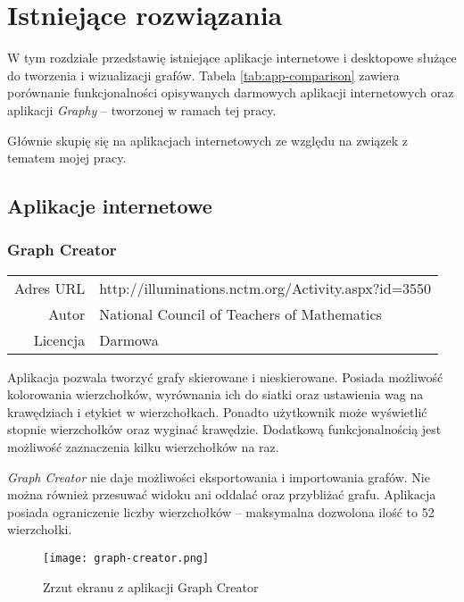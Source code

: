 \chapter{Istniejące rozwiązania}

W tym rozdziale przedstawię istniejące aplikacje internetowe \cite{mathex} i desktopowe służące do tworzenia i wizualizacji grafów. Tabela \ref{tab:app-comparison} zawiera porównanie funkcjonalności opisywanych darmowych aplikacji internetowych oraz aplikacji \emph{Graphy} -- tworzonej w ramach tej pracy. 

Głównie skupię się na aplikacjach internetowych ze względu na związek z tematem mojej pracy. 

\section{Aplikacje internetowe}

\subsection*{Graph Creator}
\bigskip
\noindent\begin{tabularx}{\textwidth}{r|X|}
\cline{2-2}
  Adres URL & http://illuminations.nctm.org/Activity.aspx?id=3550 \\ 
\cline{2-2}
 Autor & National Council of Teachers of Mathematics \\ 
\cline{2-2}
 Licencja & Darmowa\\  
\cline{2-2}
\end{tabularx} 
\bigskip

Aplikacja pozwala tworzyć grafy skierowane i nieskierowane. Posiada możliwość kolorowania wierzchołków, wyrównania ich do siatki oraz ustawienia wag na krawędziach i etykiet w wierzchołkach. Ponadto użytkownik może wyświetlić stopnie wierzchołków oraz wyginać krawędzie. Dodatkową funkcjonalnością jest możliwość zaznaczenia kilku wierzchołków na raz. 

\textit{Graph Creator} nie daje możliwości eksportowania i importowania grafów. Nie można również przesuwać widoku ani oddalać oraz przybliżać grafu. Aplikacja posiada ograniczenie liczby wierzchołków -- maksymalna dozwolona ilość to 52 wierzchołki.

\begin{figure}[H]
\centering
\texttt{[image: graph-creator.png]}
\caption{Zrzut ekranu z aplikacji Graph Creator}
\end{figure}

